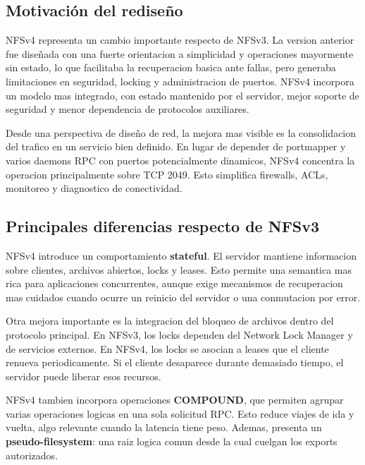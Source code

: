 \subsection{Motivación del rediseño}

NFSv4 representa un cambio importante respecto de NFSv3. La version anterior fue diseñada con una fuerte orientacion a simplicidad y operaciones mayormente sin estado, lo que facilitaba la recuperacion basica ante fallas, pero generaba limitaciones en seguridad, locking y administracion de puertos. NFSv4 incorpora un modelo mas integrado, con estado mantenido por el servidor, mejor soporte de seguridad y menor dependencia de protocolos auxiliares.

Desde una perspectiva de diseño de red, la mejora mas visible es la consolidacion del trafico en un servicio bien definido. En lugar de depender de portmapper y varios daemons RPC con puertos potencialmente dinamicos, NFSv4 concentra la operacion principalmente sobre TCP 2049. Esto simplifica firewalls, ACLs, monitoreo y diagnostico de conectividad.

\subsection{Principales diferencias respecto de NFSv3}

NFSv4 introduce un comportamiento \textbf{stateful}. El servidor mantiene informacion sobre clientes, archivos abiertos, locks y leases. Esto permite una semantica mas rica para aplicaciones concurrentes, aunque exige mecanismos de recuperacion mas cuidados cuando ocurre un reinicio del servidor o una conmutacion por error.

Otra mejora importante es la integracion del bloqueo de archivos dentro del protocolo principal. En NFSv3, los locks dependen del Network Lock Manager y de servicios externos. En NFSv4, los locks se asocian a leases que el cliente renueva periodicamente. Si el cliente desaparece durante demasiado tiempo, el servidor puede liberar esos recursos.

NFSv4 tambien incorpora operaciones \textbf{COMPOUND}, que permiten agrupar varias operaciones logicas en una sola solicitud RPC. Esto reduce viajes de ida y vuelta, algo relevante cuando la latencia tiene peso. Ademas, presenta un \textbf{pseudo-filesystem}: una raiz logica comun desde la cual cuelgan los exports autorizados.

